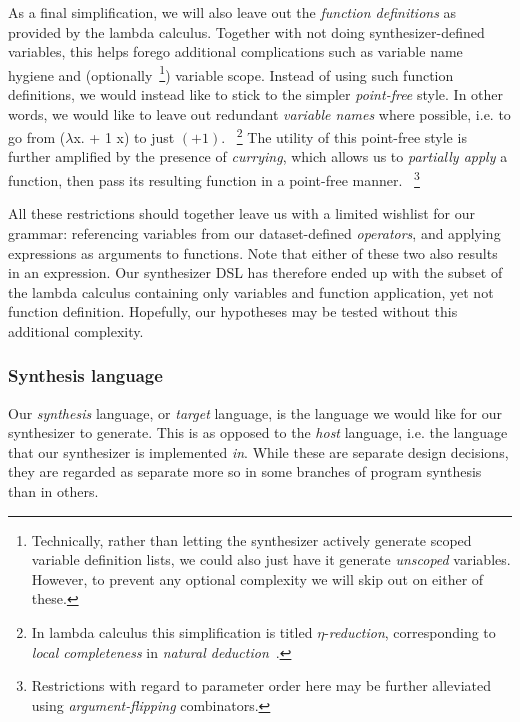 \documentclass{article}
\begin{document}
As a final simplification, we will also leave out the \emph{function definitions} as provided by the lambda calculus.
Together with not doing synthesizer-defined variables, this helps forego additional complications such as variable name hygiene and (optionally~\footnote{
    Technically, rather than letting the synthesizer actively generate scoped variable definition lists, we could also just have it generate \emph{unscoped} variables. However, to prevent any optional complexity we will skip out on either of these.
}) variable scope.
Instead of using such function definitions,
we would instead like to stick to the simpler \emph{point-free} style.
In other words, we would like to leave out redundant \emph{variable names} where possible,
i.e. to go from ($\lambda$x. + 1 x) to just $(+ 1)$.%
~\footnote{
    In lambda calculus this simplification is titled $\eta$-\emph{reduction},
    corresponding to \emph{local completeness} in \emph{natural deduction}~\citep{gentzen1935untersuchungen}.
}
The utility of this point-free style is further amplified by the presence of \emph{currying},
which allows us to \emph{partially apply} a function,
then pass its resulting function in a point-free manner.%
~\footnote{Restrictions with regard to parameter order here may be further alleviated using \emph{argument-flipping} combinators.}

All these restrictions should together leave us with a limited wishlist for our grammar:
referencing variables from our dataset-defined \emph{operators},
and applying expressions as arguments to functions.
Note that either of these two also results in an expression.
Our synthesizer DSL has therefore ended up with the subset of the
lambda calculus containing only variables and function application,
yet not function definition.
Hopefully, our hypotheses may be tested without this additional complexity.

\subsubsection{Synthesis language}

Our \emph{synthesis} language, or \emph{target} language,
is the language we would like for our synthesizer to generate.
This is as opposed to the \emph{host} language,
i.e. the language that our synthesizer is implemented \emph{in}.
While these are separate design decisions,
they are regarded as separate more so in some
branches of program synthesis than in others.
\end{document}
